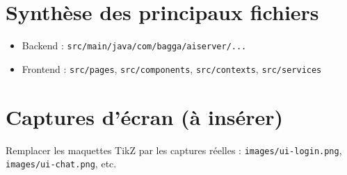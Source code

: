 \documentclass[12pt,a4paper]{report}
\begin{document}
\section{Synthèse des principaux fichiers}
\begin{itemize}
  \item Backend : \texttt{src/main/java/com/bagga/aiserver/...}
  \item Frontend : \texttt{src/pages}, \texttt{src/components}, \texttt{src/contexts}, \texttt{src/services}
\end{itemize}

\section{Captures d'écran (à insérer)}
Remplacer les maquettes TikZ par les captures réelles : \texttt{images/ui-login.png}, \texttt{images/ui-chat.png}, etc.
\end{document}
